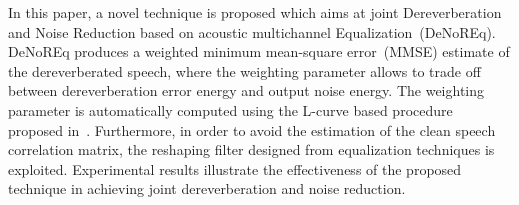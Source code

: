 \documentclass{article}
\begin{document}
In this paper, a novel technique is proposed which aims at joint Dereverberation and Noise Reduction based on acoustic multichannel Equalization~(DeNoREq).
DeNoREq produces a weighted minimum mean-square error~(MMSE) estimate of the dereverberated speech, where the weighting parameter allows to trade off between dereverberation error energy and output noise energy.
The weighting parameter is automatically computed using the L-curve based procedure proposed in~\cite{Kodrasi_ITASLP_2013}.
Furthermore, in order to avoid the estimation of the clean speech correlation matrix, the reshaping filter designed from equalization techniques is exploited. 
Experimental results illustrate the effectiveness of the proposed technique in achieving joint dereverberation and noise reduction.
\end{document}
